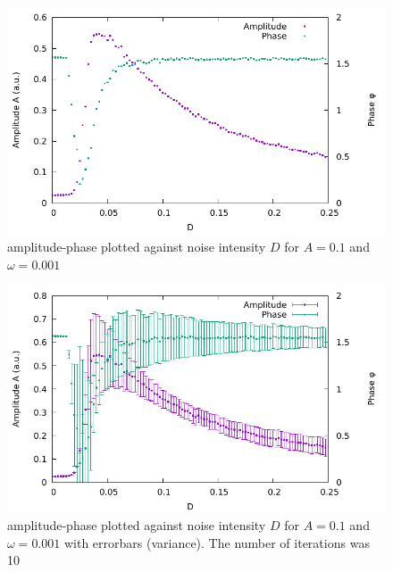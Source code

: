 \documentclass[10pt,fleqn,%
reqno,a4paper]{article}
\begin{document}
\begin{figure} 
	\includegraphics[width=\linewidth]{gnuplot_pictures/final_pictures/ampl_phase_wo_errorbars-1.pdf}
	\caption{amplitude-phase plotted against noise intensity $D$ for $A=0.1$ and $\omega=0.001$}
	\label{pic:ampl_phase_wo_errorbars}
\end{figure}

\begin{figure} 
	\includegraphics[width=\linewidth]{gnuplot_pictures/final_pictures/ampl_phase_with_errorbars-1.pdf}
	\caption{amplitude-phase plotted against noise intensity $D$ for $A=0.1$ and $\omega=0.001$ with errorbars (variance). The number of iterations was 10}
	\label{pic:ampl_phase_with_errorbars}
\end{figure}
\end{document}
